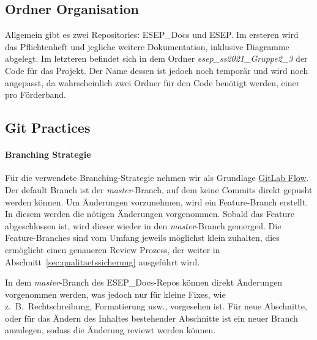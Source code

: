 
\subsection{Ordner Organisation}\label{subsec:organisation}
Allgemein gibt es zwei Repositories: ESEP\_Docs und ESEP. Im ersteren wird das Pflichtenheft und
jegliche weitere Dokumentation, inklusive Diagramme abgelegt. Im letzteren befindet sich in dem
Ordner \textit{esep\_ss2021\_Gruppe2\_3} der Code für das Projekt. Der Name dessen ist jedoch
noch temporär und wird noch angepasst, da wahrscheinlich zwei Ordner für den Code benötigt
werden, einer pro Förderband.

\subsection{Git Practices}\label{subsec:git}

\paragraph{Branching Strategie}
Für die verwendete Branching-Strategie nehmen wir als Grundlage
\href{https://docs.gitlab.com/ee/topics/gitlab_flow.html}{GitLab Flow}.
Der default Branch ist der \textit{master}-Branch, auf dem keine Commits direkt
gepusht werden können.
Um Änderungen vorzunehmen, wird ein Feature-Branch erstellt.
In diesem werden die nötigen Änderungen vorgenommen.
Sobald das Feature abgeschlossen ist, wird dieser wieder in den \textit{master}-Branch gemerged.
Die Feature-Branches sind vom Umfang jeweils möglichst klein zuhalten, dies ermöglicht einen
genaueren Review Prozess, der weiter in Abschnitt~\ref{sec:qualitaetssicherung} ausgeführt wird.

In dem \textit{master}-Branch des ESEP\_Docs-Repos können direkt Änderungen vorgenommen werden, was jedoch nur für kleine Fixes, wie
z.\ B.\ Rechtschreibung, Formatierung usw., vorgesehen ist.
Für neue Abschnitte, oder für das Ändern des Inhaltes bestehender Abschnitte ist ein neuer Branch
anzulegen, sodass die Änderung reviewt werden können.

